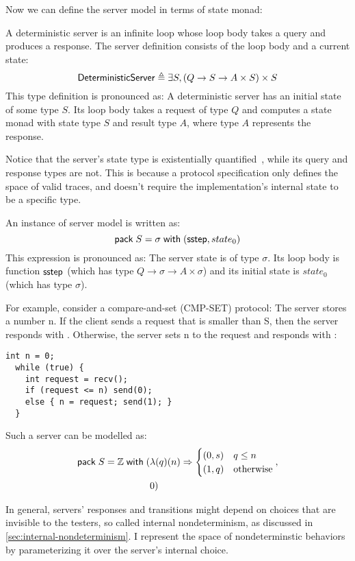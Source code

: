 Now we can define the server model in terms of state monad:

\begin{definition}
  \label{def:qaserver}
  A deterministic server is an infinite loop whose loop body takes a query and
  produces a response.  The server definition consists of the loop body and a
  current state:
  \[\mathsf{DeterministicServer}\triangleq\exists S,(Q \to S \to A \times S) \times S\]
  This type definition is pronounced as: A deterministic server has an initial
  state of some type $S$.  Its loop body takes a request of type $Q$ and
  computes a state monad with state type $S$ and result type $A$, where type $A$
  represents the response.

  Notice that the server's state type is existentially quantified~\cite{tapl},
  while its query and response types are not.  This is because a protocol
  specification only defines the space of valid traces, and doesn't require the
  implementation's internal state to be a specific type.

  An instance of server model is written as:
  \[\mathsf{pack}\;S=\sigma\;\mathsf{with}\;(\mathsf{sstep},state_0)\]
  This expression is pronounced as: The server state is of type $\sigma$.  Its
  loop body is function $\mathsf{sstep}$ (which has type $Q\to\sigma\to A\times\sigma$)
  and its initial state is $state_0$ (which has type $\sigma$).
\end{definition}

For example, consider a compare-and-set (CMP-SET) protocol: The server stores a
number \inlinec n.  If the client sends a request that is smaller than \inlinec
S, then the server responds with .  Otherwise, the server sets
\inlinec n to the request and responds with :
\begin{lstlisting}[style=customc]
  int n = 0;
  while (true) {
    int request = recv();
    if (request <= n) send(0);
    else { n = request; send(1); }
  }
\end{lstlisting}

Such a server can be modelled as:
\begin{align*}
  \mathsf{pack}\;S=\mathbb Z\;\mathsf{with}\;(&\lambda(q)(n)\Rightarrow\begin{cases}
        (0,s)&q\le n\\
        (1,q)&\mathrm{otherwise}
    \end{cases},\\
    &0)
\end{align*}

In general, servers' responses and transitions might depend on choices that are
invisible to the testers, so called internal nondeterminism, as discussed in
\autoref{sec:internal-nondeterminism}.  I represent the space of nondeterminstic
behaviors by parameterizing it over the server's internal choice.

